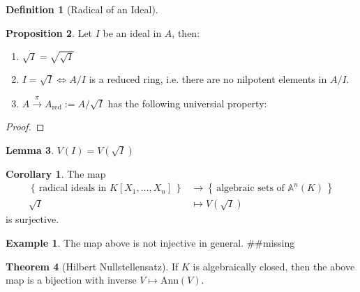 \documentclass[a4paper]{book}
\theoremstyle{definition}
\newtheorem{definition}{Definition}[]
\newtheorem{example}{Example}[definition]
\newtheorem{theorem}[definition]{Theorem}
\newtheorem{corollary}{Corollary}
\newtheorem{lemma}[definition]{Lemma}
\newtheorem{proposition}[definition]{Proposition}
\newcommand{\set}[1]{\left\{\, #1 \,\right\}}
\begin{document}
\begin{defbox}    
    \begin{definition}[Radical of an Ideal]

    \end{definition}
\end{defbox}
\begin{thmbox}
    \begin{proposition}
        Let \(I\) be an ideal in \(A\), then:
        \begin{enumerate}
            \item \(\sqrt{I} = \sqrt{\sqrt{I}}\)
            \item \(I = \sqrt{I} \iff A / I\) is a reduced ring, i.e. there are no nilpotent elements in \(A / I\).
            \item \(A \overset{\pi}{\longrightarrow} A_\text{red} := A / \sqrt{I}\) has the following universial property:
        \end{enumerate}
    \end{proposition}
\end{thmbox}
\begin{proof}
    
\end{proof}
\begin{thmbox}
    \begin{lemma}
        \(V(I) = V(\sqrt{I})\)
    \end{lemma}
\end{thmbox}
\begin{thmbox}
    \begin{corollary}
        The map
        \begin{align*}
            \set{\text{radical ideals in } K[X_1, \ldots, X_n]} &\rightarrow \set{\text{algebraic sets of }\mathbb{A}^n(K)} \\
            \sqrt{I} &\mapsto V(\sqrt{I})
        \end{align*}
        is surjective.
    \end{corollary}
\end{thmbox}
\begin{exmbox}
    \begin{example}
        The map above is not injective in general. \#\#missing
    \end{example}
\end{exmbox}

\begin{thmbox}
    \begin{theorem}[Hilbert Nullstellensatz]
        If \(K\) is algebraically closed, then the above map is a bijection with inverse \(V \mapsto \text{Ann}(V)\).
    \end{theorem}
\end{thmbox}
\end{document}

